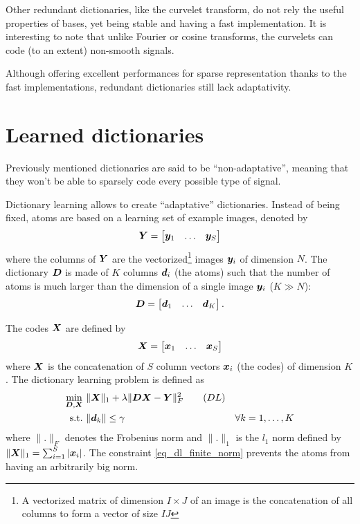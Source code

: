 Other redundant dictionaries, like the curvelet transform, do not rely the useful properties of bases, yet being stable and having a fast implementation. It is interesting to note that unlike Fourier or cosine transforms, the curvelets can code (to an extent) non-smooth signals.


Although offering excellent performances for sparse representation thanks to the fast implementations, redundant dictionaries still lack adaptativity.


\section{Learned dictionaries}
Previously mentioned dictionaries are said to be “non-adaptative”, meaning that they won’t be able to sparsely code every possible type of signal.

Dictionary learning allows to create “adaptative” dictionaries. Instead of being fixed, atoms are based on a learning set of example images, denoted by
$$\bm{Y} = \begin{bmatrix} \bm{y}_1 & \dots & \bm{y}_S \end{bmatrix}$$
where the columns of $\bm{Y}$ are the vectorized\footnote{A vectorized matrix of dimension $I \times J$ of an image is the concatenation of all columns to form a vector of size $IJ$} images $\bm{y}_i$ of dimension $N$. The dictionary $\bm{D}$ is made of $K$ columns $\bm{d}_i$ (the atoms) such that the number of atoms is much larger than the dimension of a single image $\bm{y}_i$ ($K \gg N$):
$$\bm{D} = \begin{bmatrix} \bm{d}_1 & \dots & \bm{d}_K \end{bmatrix}.$$

The codes $\bm{X}$ are defined by
$$\bm{X} = \begin{bmatrix} \bm{x}_1 & \dots & \bm{x}_S \end{bmatrix}$$
where $\bm{X}$ is the concatenation of $S$ column vectors $\bm{x}_i$ (the codes) of dimension $K$. The dictionary learning problem is defined as
\begin{align}
\underset{\bm{D},\bm{X}}{\min}~ & \lVert \bm{X} \rVert_1 + \lambda\lVert \bm{D}\bm{X}-\bm{Y} \rVert^2_F \tag{$DL$} \label{eq_dl} \\
\text{s.t.}~ & \lVert \bm{d}_k \rVert \le \gamma & \forall k = 1,\dots,K\label{eq_dl_finite_norm}
\end{align}
where $\lVert . \rVert_F$ denotes the Frobenius norm and $\lVert . \rVert_1$ is the $l_1$ norm defined by $\lVert \bm{X} \rVert_1 = \sum_{i=1}^S |\bm{x}_i|$. The constraint \ref{eq_dl_finite_norm} prevents the atoms from having an arbitrarily big norm.

